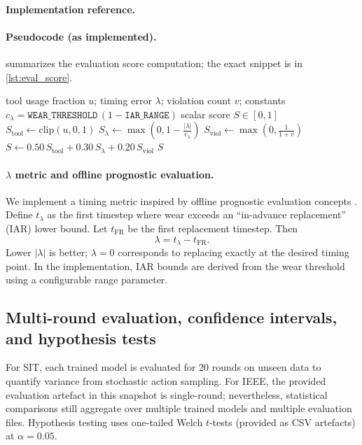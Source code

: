 \documentclass[11pt]{article}
\begin{document}
\paragraph{Implementation reference.}
\paragraph{Pseudocode (as implemented).}
 summarizes the evaluation score computation; the exact snippet is in \cref{lst:eval_score}.

\begin{algorithm}[t]
\caption{Evaluation score computation (per evaluation run)}
\label{alg:eval_score}
\begin{algorithmic}[1]
\Require tool usage fraction $u$; timing error $\lambda$; violation count $v$; constants $c_{\lambda}=\texttt{WEAR\_THRESHOLD}\,(1-\texttt{IAR\_RANGE})$
\Ensure scalar score $S\in[0,1]$
\State $S_{\mathrm{tool}} \gets \mathrm{clip}(u, 0, 1)$
\State $S_{\lambda} \gets \max\left(0, 1 - \frac{|\lambda|}{c_{\lambda}}\right)$
\State $S_{\mathrm{viol}} \gets \max\left(0, \frac{1}{1+v}\right)$
\State $S \gets 0.50\,S_{\mathrm{tool}} + 0.30\,S_{\lambda} + 0.20\,S_{\mathrm{viol}}$
\State \Return $S$
\end{algorithmic}
\end{algorithm}

\paragraph{$\lambda$ metric and offline prognostic evaluation.}
We implement a timing metric inspired by offline prognostic evaluation concepts \parencite{Saxena2008Metrics}. Define $t_{\lambda}$ as the first timestep where wear exceeds an ``in-advance replacement'' (IAR) lower bound. Let $t_{\mathrm{FR}}$ be the first replacement timestep. Then
\begin{equation}
	\lambda = t_{\lambda} - t_{\mathrm{FR}}.
\end{equation}
Lower $|\lambda|$ is better; $\lambda=0$ corresponds to replacing exactly at the desired timing point. In the implementation, IAR bounds are derived from the wear threshold using a configurable range parameter.

\subsection{Multi-round evaluation, confidence intervals, and hypothesis tests}
For SIT, each trained model is evaluated for 20 rounds on unseen data to quantify variance from stochastic action sampling. For IEEE, the provided evaluation artefact in this snapshot is single-round; nevertheless, statistical comparisons still aggregate over multiple trained models and multiple evaluation files. Hypothesis testing uses one-tailed Welch $t$-tests (provided as CSV artefacts) at $\alpha=0.05$.
\end{document}
